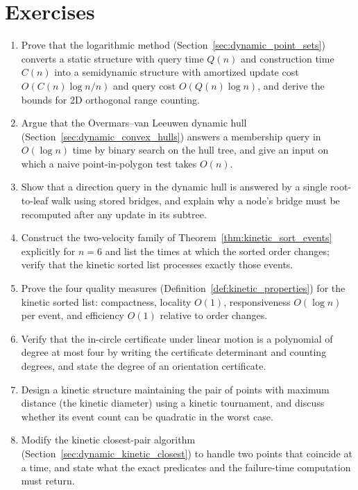 
\section{Exercises}
\label{sec:dynamic_exercises}

\begin{enumerate}
  \item Prove that the logarithmic method (Section~\ref{sec:dynamic_point_sets})
    converts a static structure with query time $Q(n)$ and construction time
    $C(n)$ into a semidynamic structure with amortized update cost
    $O(C(n)\log n / n)$ and query cost $O(Q(n)\log n)$, and derive the bounds
    for 2D orthogonal range counting.
  \item Argue that the Overmars--van Leeuwen dynamic hull
    (Section~\ref{sec:dynamic_convex_hulls}) answers a membership query in
    $O(\log n)$ time by binary search on the hull tree, and give an input on
    which a naive point-in-polygon test takes $O(n)$.
  \item Show that a direction query in the dynamic hull is answered by a
    single root-to-leaf walk using stored bridges, and explain why a node's
    bridge must be recomputed after any update in its subtree.
  \item Construct the two-velocity family of Theorem~\ref{thm:kinetic_sort_events}
    explicitly for $n = 6$ and list the times at which the sorted order
    changes; verify that the kinetic sorted list processes exactly those
    events.
  \item Prove the four quality measures (Definition~\ref{def:kinetic_properties})
    for the kinetic sorted list: compactness, locality $O(1)$, responsiveness
    $O(\log n)$ per event, and efficiency $O(1)$ relative to order changes.
  \item Verify that the in-circle certificate under linear motion is a
    polynomial of degree at most four by writing the certificate determinant
    and counting degrees, and state the degree of an orientation certificate.
  \item Design a kinetic structure maintaining the pair of points with
    maximum distance (the kinetic diameter) using a kinetic tournament, and
    discuss whether its event count can be quadratic in the worst case.
  \item Modify the kinetic closest-pair algorithm
    (Section~\ref{sec:dynamic_kinetic_closest}) to handle two points that
    coincide at a time, and state what the exact predicates and the
    failure-time computation must return.
\end{enumerate}
